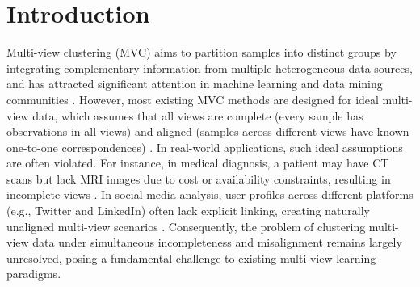 \documentclass{article}
\theoremstyle{plain}
\theoremstyle{definition}
\theoremstyle{remark}
\begin{document}
\begin{abstract}
\end{abstract}

\section{Introduction}\label{introduction}

Multi-view clustering (MVC) aims to partition samples into distinct groups by integrating complementary information from multiple heterogeneous data sources, and has attracted significant attention in machine learning and data mining communities \cite{chaoSurveyMultiviewClustering2021,chowdhuryDeepMultiviewClustering2025,11277376}. However, most existing MVC methods are designed for {ideal} multi-view data, which assumes that all views are {complete} (every sample has observations in all views) and {aligned} (samples across different views have known one-to-one correspondences) \cite{xuMultilevelFeatureLearning2022,zhangLetDataChoose2023,renDynamicWeightedGraph2024}. In real-world applications, such ideal assumptions are often violated. For instance, in medical diagnosis, a patient may have CT scans but lack MRI images due to cost or availability constraints, resulting in {incomplete} views \cite{linCOMPLETERIncompleteMultiview2021}. 
In social media analysis, user profiles across different platforms (e.g., Twitter and LinkedIn) often lack explicit linking, creating naturally unaligned multi-view scenarios \cite{xinMultilevelReliableGuidance2025}. Consequently, the problem of clustering multi-view data under simultaneous incompleteness and misalignment remains largely unresolved, posing a fundamental challenge to existing multi-view learning paradigms. %
\end{document}
